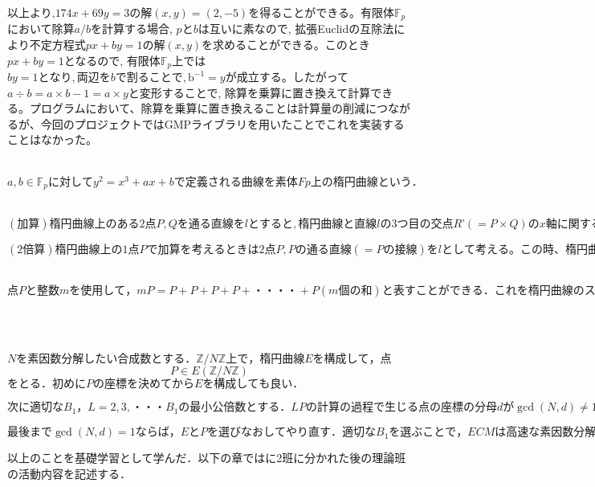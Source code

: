 \documentclass[openany,11pt,papersize]{jsbook}
\begin{document}
\begin{description}
以上より,$174x+69y=3の解(x,y)=(2,-5)$を得ることができる。有限体$\mathbb{F}_p$において除算$a/b$を計算する場合, $pとb$は互いに素なので, 拡張Euclidの互除法により不定方程式$px + by = 1 の解(x, y)$を求めることができる。このとき$px+ by= 1$となるので, 有限体$\mathbb{F}_p$上では$by = 1となり,両辺をbで割ることで,\mathrm{b}^{-1} = y$が成立する。したがって$a ÷ b = a×b-1=a × y$と変形することで, 除算を乗算に置き換えて計算できる。プログラムにおいて、除算を乗算に置き換えることは計算量の削減につながるが、今回のプロジェクトではGMPライブラリを用いたことでこれを実装することはなかった。
	
\item[楕円曲線の定義方程式]\mbox{}\\
	$a,b \in \mathbb{F}_pに対してy^2 = x^3 + ax + bで定義される曲線を素体Fp上の楕円曲線という．$

\item[楕円曲線の加算・2倍算]\mbox{}\\
$(加算) 楕円曲線上のある2点P,Qを通る直線をlとすると,楕円曲線と直線lの3つ目の交点R’(=P×Q)のx軸に関する対称点をRとする。このとき2点P,Qの和をP+Q:=Rと定義し、楕円曲線の加算という。$
	
$(2倍算) 楕円曲線上の1点Pで加算を考えるときは2点P,Pの通る直線(=Pの接線)をlとして考える。この時、楕円曲線と直線lのP以外の交点のx軸に関する対称点をRとしたとき、2P=P+P:=Rとできる。これが楕円曲線の2倍算である。
$
	
\item[楕円曲線のスカラー倍]\mbox{}\\
	$点Pと整数mを使用して，mP=P+P+P+P+・・・・+P(m個の和)と表すことができる．これを楕円曲線のスカラー倍という．$

\item[加算公式]\mbox{}\\

\item[楕円曲線法のアルゴリズム ]\mbox{}\\
	$Nを素因数分解したい合成数とする．\mathbb{Z}/N\mathbb{Z}上で，楕円曲線Eを構成して，点$
	\begin{equation}
	P \in E(\mathbb{Z}/N\mathbb{Z})
	\end{equation}
	$をとる．初めにPの座標を決めてからEを構成しても良い．$
	
	$次に適切なB_1，L=2,3,・・・B_1の最小公倍数とする．LPの計算の過程で生じる点の座標の分母dが\gcd(N,d) \neq 1となるとNの約数を発見できる．$
	
	$最後まで\gcd (N,d)=1ならば，EとPを選びなおしてやり直す．適切なB_1を選ぶことで，ECMは高速な素因数分解法になることが知られている．$
\end{description}
以上のことを基礎学習として学んだ．以下の章ではに2班に分かれた後の理論班の活動内容を記述する．
\end{document}
